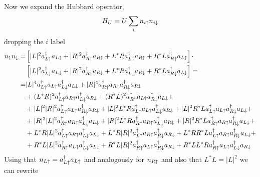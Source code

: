 Now we expand the Hubbard operator,
\begin{equation*}
  H_U = U\sum_i n_{i\uparrow}n_{i\downarrow}
\end{equation*}
dropping the $i$ label
\begin{equation*}
  \begin{split}
    n_\uparrow n_\downarrow= &\left[
    |L|^2 a^{\dagger}_{L\uparrow}a_{L\uparrow}+
    |R|^2 a^{\dagger}_{R\uparrow}a_{R\uparrow}+
    L^*Ra^{\dagger}_{L\uparrow}a_{R\uparrow}+
    R^*La^{\dagger}_{R\uparrow}a_{L\uparrow}
    \right]\cdot\\
    &\left[
    |L|^2 a^{\dagger}_{L\downarrow}a_{L\downarrow}+
    |R|^2 a^{\dagger}_{R\downarrow}a_{R\downarrow}+
    L^*Ra^{\dagger}_{L\downarrow}a_{R\downarrow}+
    R^*La^{\dagger}_{R\downarrow}a_{L\downarrow}
  \right]=\\
    =& |L|^4 a^{\dagger}_{L\uparrow}a_{L\uparrow}a^{\dagger}_{L\downarrow}a_{L\downarrow}+
     |R|^4 a^{\dagger}_{R\uparrow}a_{R\uparrow}a^{\dagger}_{R\downarrow}a_{R\downarrow}\\
  &+ (L^*R)^2a^{\dagger}_{L\uparrow}a_{R\uparrow}a^{\dagger}_{L\downarrow}a_{R\downarrow}+
     (R^*L)^2a^{\dagger}_{R\uparrow}a_{L\uparrow}a^{\dagger}_{R\downarrow}a_{L\downarrow}+\\
  &+|L|^2|R|^2a^{\dagger}_{L\uparrow}a_{L\uparrow}a^{\dagger}_{R\downarrow}a_{R\downarrow}+
    |L|^2L^*R a^{\dagger}_{L\uparrow}a_{L\uparrow}a^{\dagger}_{L\downarrow}a_{R\downarrow}+
    |L|^2R^*L a^{\dagger}_{L\uparrow}a_{L\uparrow}a^{\dagger}_{R\downarrow}a_{L\downarrow}+\\
  &+|R|^2|L|^2 a^{\dagger}_{R\uparrow}a_{R\uparrow}a^{\dagger}_{L\downarrow}a_{L\downarrow}+
    |R|^2L^*R a^{\dagger}_{R\uparrow}a_{R\uparrow}a^{\dagger}_{L\downarrow}a_{R\downarrow}+
    |R|^2R^*L a^{\dagger}_{R\uparrow}a_{R\uparrow}a^{\dagger}_{R\downarrow}a_{L\downarrow}+\\
  &+L^*R|L|^2a^{\dagger}_{L\uparrow}a_{R\uparrow}a^{\dagger}_{L\downarrow}a_{L\downarrow}+
    L^*R|R|^2a^{\dagger}_{L\uparrow}a_{R\uparrow}a^{\dagger}_{R\downarrow}a_{R\downarrow}+
    L^*RR^*La^{\dagger}_{L\uparrow}a_{R\uparrow}a^{\dagger}_{R\downarrow}a_{L\downarrow}+\\
  &+R^*L|L|^2a^{\dagger}_{R\uparrow}a_{L\uparrow}a^{\dagger}_{L\downarrow}a_{L\downarrow}+
    R^*L|R|^2a^{\dagger}_{R\uparrow}a_{L\uparrow}a^{\dagger}_{R\downarrow}a_{R\downarrow}+
    R^*LL^*Ra^{\dagger}_{R\uparrow}a_{L\uparrow}a^{\dagger}_{L\downarrow}a_{R\downarrow}
  \end{split}
\end{equation*}
Using that $n_{L\uparrow} = a^{\dagger}_{L\uparrow}a_{L\uparrow}$ and analogously for $n_{R\uparrow}$ and also that $L^*L=|L|^2$ we can rewrite
